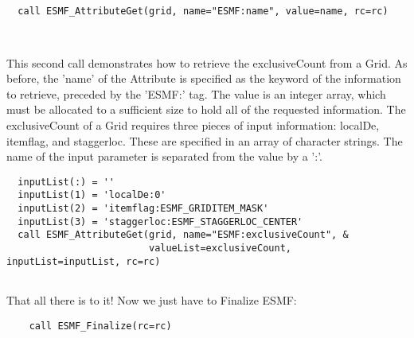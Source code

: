  \begin{verbatim}

  call ESMF_AttributeGet(grid, name="ESMF:name", value=name, rc=rc)

 
\end{verbatim}
 

    This second call demonstrates how to retrieve the exclusiveCount from
    a Grid.  As before, the 'name' of the Attribute is specified as the
    keyword of the information to retrieve, preceded by the 'ESMF:' tag.
    The value is an integer array, which must be allocated to a sufficient
    size to hold all of the requested information.  The exclusiveCount of
    a Grid requires three pieces of input information: localDe, itemflag, and
    staggerloc.  These are specified in an array of character strings.  The
    name of the input parameter is separated from the value by a ':'. 

 \begin{verbatim}
  inputList(:) = ''
  inputList(1) = 'localDe:0'
  inputList(2) = 'itemflag:ESMF_GRIDITEM_MASK'
  inputList(3) = 'staggerloc:ESMF_STAGGERLOC_CENTER'
  call ESMF_AttributeGet(grid, name="ESMF:exclusiveCount", &
                         valueList=exclusiveCount, inputList=inputList, rc=rc)
 
\end{verbatim}
 

    That all there is to it!  Now we just have to Finalize ESMF: 

 \begin{verbatim}
    call ESMF_Finalize(rc=rc)
 
\end{verbatim}

\setlength{\parskip}{\oldparskip}
\setlength{\parindent}{\oldparindent}
\setlength{\baselineskip}{\oldbaselineskip}
